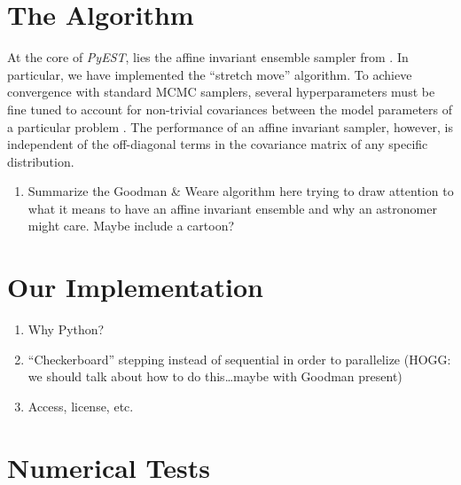 \documentclass[12pt,preprint]{aastex}
\newcommand{\project}[1]{\textsl{#1}}
\newcommand{\this}{\project{PyEST}}
\begin{document}
\section{The Algorithm}

\citet{Hou:2011}

At the core of \this , lies the affine invariant ensemble sampler from
\citep{Goodman:2010}.  In particular, we have implemented the ``stretch move''
algorithm.  To achieve convergence with standard MCMC samplers, several
hyperparameters must be fine tuned to account for non-trivial covariances between
the model parameters of a particular problem \citep[e.g.][]{Dunkley:2005}.
The performance of an affine invariant sampler, however, is independent of the
off-diagonal terms in the covariance matrix of any specific distribution.

\begin{enumerate}

    \item Summarize the Goodman \& Weare algorithm here trying to draw attention
        to what it means to have an affine invariant ensemble and why an astronomer
        might care. Maybe include a cartoon?

\end{enumerate}

\section{Our Implementation}

\begin{enumerate}

    \item Why Python?

    \item ``Checkerboard'' stepping instead of sequential in order to parallelize
        (HOGG: we should talk about how to do this\ldots maybe with Goodman present)

    \item Access, license, etc.

\end{enumerate}

\section{Numerical Tests}
\end{document}
